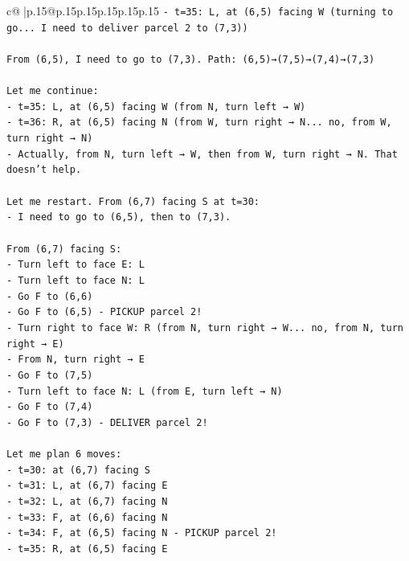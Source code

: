 \documentclass{article}
\begin{document}
{\begin{supertabular}{c@{$\;$}|p{.15\linewidth}@{}p{.15\linewidth}p{.15\linewidth}p{.15\linewidth}p{.15\linewidth}p{.15\linewidth}}
{{{\texttt{{-} t=35: L, at (6,5) facing W (turning to go... I need to deliver parcel 2 to (7,3))} \\
\\ 
\texttt{From (6,5), I need to go to (7,3). Path: (6,5)→(7,5)→(7,4)→(7,3)} \\
\\ 
\texttt{Let me continue:} \\
\texttt{{-} t=35: L, at (6,5) facing W (from N, turn left → W)} \\
\texttt{{-} t=36: R, at (6,5) facing N (from W, turn right → N... no, from W, turn right → N)} \\
\texttt{{-} Actually, from N, turn left → W, then from W, turn right → N. That doesn't help.} \\
\\ 
\texttt{Let me restart. From (6,7) facing S at t=30:} \\
\texttt{{-} I need to go to (6,5), then to (7,3).} \\
\\ 
\texttt{From (6,7) facing S:} \\
\texttt{{-} Turn left to face E: L} \\
\texttt{{-} Turn left to face N: L} \\
\texttt{{-} Go F to (6,6)} \\
\texttt{{-} Go F to (6,5) {-} PICKUP parcel 2!} \\
\texttt{{-} Turn right to face W: R (from N, turn right → W... no, from N, turn right → E)} \\
\texttt{{-} From N, turn right → E} \\
\texttt{{-} Go F to (7,5)} \\
\texttt{{-} Turn left to face N: L (from E, turn left → N)} \\
\texttt{{-} Go F to (7,4)} \\
\texttt{{-} Go F to (7,3) {-} DELIVER parcel 2!} \\
\\ 
\texttt{Let me plan 6 moves:} \\
\texttt{{-} t=30: at (6,7) facing S} \\
\texttt{{-} t=31: L, at (6,7) facing E} \\
\texttt{{-} t=32: L, at (6,7) facing N} \\
\texttt{{-} t=33: F, at (6,6) facing N} \\
\texttt{{-} t=34: F, at (6,5) facing N {-} PICKUP parcel 2!} \\
\texttt{{-} t=35: R, at (6,5) facing E} \\
}}}
\end{supertabular}}
\end{document}
